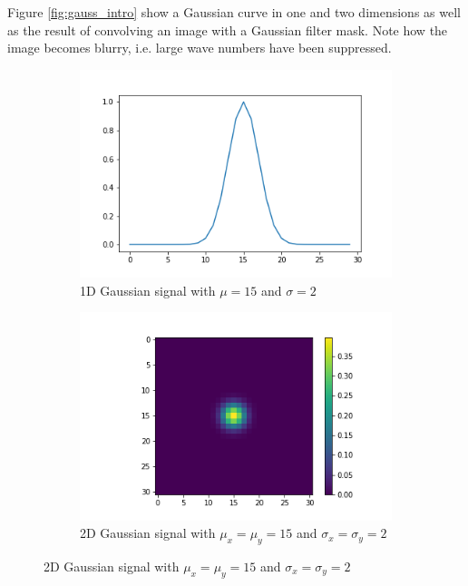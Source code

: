 		Figure \ref{fig:gauss_intro} show a Gaussian curve in one and two dimensions as well as the result of convolving an image with a Gaussian filter mask. Note how the image becomes blurry, i.e. large wave numbers have been suppressed.
		\begin{figure}
		    \centering
		    \begin{subfigure}[b]{0.3\textwidth}
		        \includegraphics[width=\textwidth]{graphs/gauss_sigma_2.png}
		        \caption{1D Gaussian signal with $\mu=15$ and $\sigma=2$}
		    \end{subfigure}
		    
		    \begin{subfigure}[b]{0.3\textwidth}
		        \includegraphics[width=\textwidth]{images/gauss_sigma_2.png}
		        \caption{2D Gaussian signal with $\mu_x = \mu_y = 15$ and $\sigma_x = \sigma_y = 2$}
		    \end{subfigure}
		    

\end{figure}
